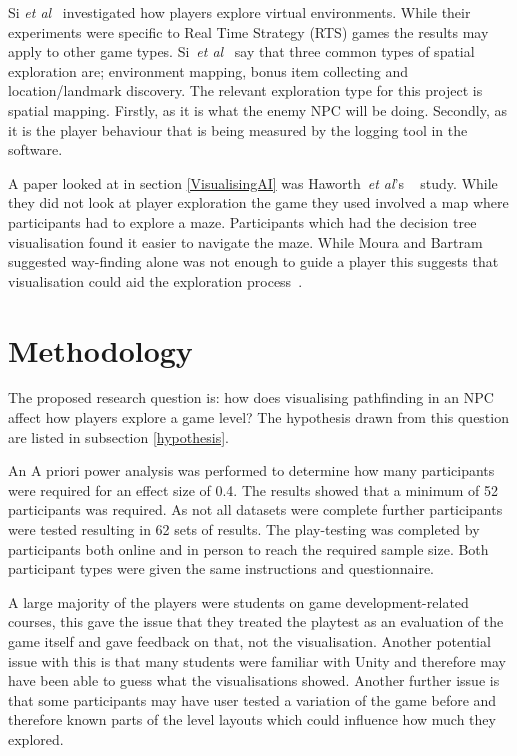 \documentclass[journal]{IEEEtran}
\begin{document}
	Si \textit{et al}~\cite{si2017} investigated how players explore virtual environments. While their experiments were specific to Real Time Strategy (RTS) games the results may apply to other game types. Si~\textit{et al}~\cite{si2017} say that three common types of spatial exploration are; environment mapping, bonus item collecting and location/landmark discovery. The relevant exploration type for this project is spatial mapping. Firstly, as it is what the enemy NPC will be doing.  Secondly, as it is the player behaviour that is being measured by the logging tool in the software.
	
	A paper looked at in section \ref{VisualisingAI} was Haworth~\textit{et al}'s ~\cite{Haworth2010} study. While they did not look at player exploration the game they used involved a map where participants had to explore a maze. Participants which had the decision tree visualisation found it easier to navigate the maze. While Moura and Bartram~\cite{moura2014} suggested way-finding alone was not enough to guide a player this suggests that visualisation could aid the exploration process~\cite{Haworth2010}.
	
	\section{Methodology} \label{methodology}
	The proposed research question is: how does visualising pathfinding in an NPC affect how players explore a game level? The hypothesis drawn from this question are listed in subsection \ref{hypothesis}.  
	
	An A priori power analysis was performed to determine how many participants were required for an effect size of 0.4. The results showed that a minimum of 52 participants was required. As not all datasets were complete further participants were tested resulting in 62 sets of results.     
	The play-testing was completed by participants both online and in person to reach the required sample size. Both participant types were given the same instructions and questionnaire.
	
	A large majority of the players were students on game development-related courses, this gave the issue that they treated the playtest as an evaluation of the game itself and gave feedback on that, not the visualisation.  Another potential issue with this is that many students were familiar with Unity and therefore may have been able to guess what the visualisations showed. 
	Another further issue is that some participants may have user tested a variation of the game before and therefore known parts of the level layouts which could influence how much they explored. 
	
\end{document}
